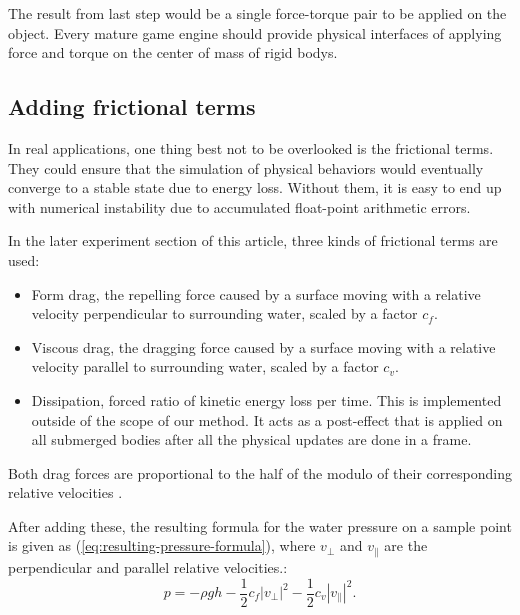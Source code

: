 The result from last step would be a single force-torque pair to be applied on the object.
Every mature game engine should provide physical interfaces of applying force and torque on the center of mass of rigid bodys.

\subsection{Adding frictional terms}

In real applications, one thing best not to be overlooked is the frictional terms.
They could ensure that the simulation of physical behaviors would eventually converge to a stable state due to energy loss.
Without them, it is easy to end up with numerical instability due to accumulated float-point arithmetic errors.

In the later experiment section of this article, three kinds of frictional terms are used:
\begin{itemize}
	\item Form drag, the repelling force caused by a surface moving with a relative velocity perpendicular to surrounding water, scaled by a factor $c_f$.
	\item Viscous drag, the dragging force caused by a surface moving with a relative velocity parallel to surrounding water, scaled by a factor $c_v$.
	\item Dissipation, forced ratio of kinetic energy loss per time.
				This is implemented outside of the scope of our method.
				It acts as a post-effect that is applied on all submerged bodies after all the physical updates are done in a frame.
\end{itemize}
Both drag forces are proportional to the half of the modulo of their corresponding relative velocities \cite{trouton1906coefficient}.

After adding these, the resulting formula for the water pressure on a sample point is given as (\ref{eq:resulting-pressure-formula}), where $v_{\perp}$ and $v_{\parallel}$ are the perpendicular and parallel relative velocities.:
\begin{equation}
	p=-\rho gh-\frac12c_f|v_{\perp}|^2-\frac12c_v|v_{\parallel}|^2.
	\label{eq:resulting-pressure-formula}
\end{equation}